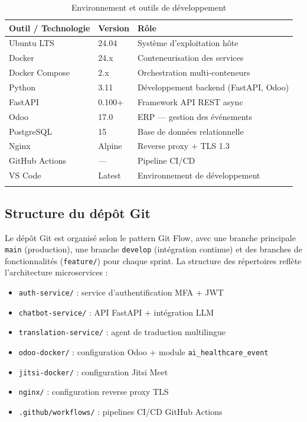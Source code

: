 \begin{longtable}{|m{4cm}|m{3cm}|m{5.5cm}|}
\hline
\textbf{Outil / Technologie} & \textbf{Version} & \textbf{Rôle} \\
\hline
\endhead
\endfoot
\endlastfoot
\hline
Ubuntu LTS & 24.04 & Système d'exploitation hôte \\
\hline
Docker & 24.x & Conteneurisation des services \\
\hline
Docker Compose & 2.x & Orchestration multi-conteneurs \\
\hline
Python & 3.11 & Développement backend (FastAPI, Odoo) \\
\hline
FastAPI & 0.100+ & Framework API REST async \\
\hline
Odoo & 17.0 & ERP — gestion des événements \\
\hline
PostgreSQL & 15 & Base de données relationnelle \\
\hline
Nginx & Alpine & Reverse proxy + TLS 1.3 \\
\hline
GitHub Actions & — & Pipeline CI/CD \\
\hline
VS Code & Latest & Environnement de développement \\
\hline
\captionsetup{justification=centering,margin=2cm}
\caption{Environnement et outils de développement}
\label{tab:dev_env}
\end{longtable}

\subsection{Structure du dépôt Git}
Le dépôt Git est organisé selon le pattern Git Flow, avec une branche principale \texttt{main} (production), une branche \texttt{develop} (intégration continue) et des branches de fonctionnalités (\texttt{feature/}) pour chaque sprint. La structure des répertoires reflète l'architecture microservices :

\begin{itemize}
    \item \texttt{auth-service/} : service d'authentification MFA + JWT
    \item \texttt{chatbot-service/} : API FastAPI + intégration LLM
    \item \texttt{translation-service/} : agent de traduction multilingue
    \item \texttt{odoo-docker/} : configuration Odoo + module \texttt{ai\_healthcare\_event}
    \item \texttt{jitsi-docker/} : configuration Jitsi Meet
    \item \texttt{nginx/} : configuration reverse proxy TLS
    \item \texttt{.github/workflows/} : pipelines CI/CD GitHub Actions
\end{itemize}

